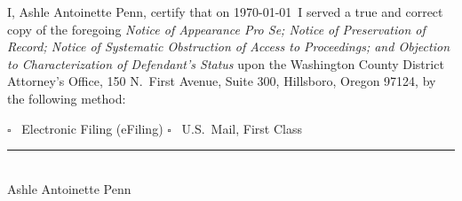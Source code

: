 \documentclass[12pt,letterpaper]{article}
\begin{document}
I, Ashle\textquotesingle{} Antoinette Penn, certify that on \today\ I served a
true and correct copy of the foregoing \textit{Notice of Appearance Pro Se;
Notice of Preservation of Record; Notice of Systematic Obstruction of Access
to Proceedings; and Objection to Characterization of Defendant's Status} upon
the Washington County District Attorney's Office, 150 N.\ First Avenue,
Suite 300, Hillsboro, Oregon 97124, by the following method:

\vspace{12pt}
\noindent $\square$ \ Electronic Filing (eFiling)
\hspace{0.8in}
$\square$ \ U.S.\ Mail, First Class

\vspace{36pt}
\noindent\rule{2.5in}{0.4pt}\\[4pt]
Ashle\textquotesingle{} Antoinette Penn
\end{document}
